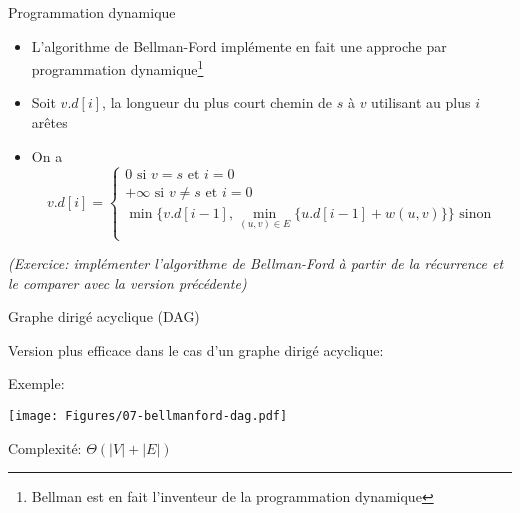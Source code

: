 \begin{frame}{Programmation dynamique}

\begin{itemize}
\item L'algorithme de Bellman-Ford implémente en fait une approche par
  programmation dynamique\footnote{Bellman est en fait l'inventeur de la programmation dynamique}
\item Soit $v.d[i]$, la longueur du plus court chemin de $s$ à $v$ utilisant au plus $i$ arêtes
\item On a
{\footnotesize
\[v.d[i]=\left\{\begin{array}{l}
0 \mbox{   si }v=s\mbox{ et }i=0\\
+\infty \mbox{   si }v\neq s\mbox{ et }i=0\\
\min\{v.d[i-1],\min_{(u,v)\in E}\{u.d[i-1]+w(u,v)\}\} \mbox{   sinon}\\
  \end{array}\right.\]}
\end{itemize}

\bigskip

{\it (Exercice: implémenter l'algorithme de Bellman-Ford à partir de
  la récurrence et le comparer avec la version précédente)}

\end{frame}

\begin{frame}{Graphe dirigé acyclique (DAG)}

Version plus efficace dans le cas d'un graphe dirigé acyclique:
\begin{center}
{\small
{}}
\end{center}

\bigskip

Exemple:
\centerline{\texttt{[image: Figures/07-bellmanford-dag.pdf]}}

\bigskip

Complexité: $\Theta(|V|+|E|)$

\end{frame}

